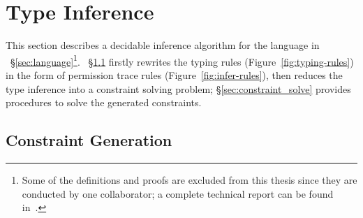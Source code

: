 {{{ \section{Type Inference}\label{sec:constraint_gen}
This section describes a decidable inference algorithm for the language  in ~\S\ref{sec:language}\footnote{Some of the definitions and proofs are excluded from this thesis since they are conducted by one collaborator; a complete technical report can be found in~\cite{Chen17arxiv}.}.
~\S\ref{sec:constraint-gen-rules} firstly rewrites the typing
rules (Figure~\ref{fig:typing-rules}) in the form of permission trace
rules (Figure~\ref{fig:infer-rules}), then reduces the type inference
into a constraint solving problem; \S\ref{sec:constraint_solve}
provides procedures to solve the generated constraints.


\subsection{Constraint Generation}\label{sec:constraint-gen-rules}
}}}
